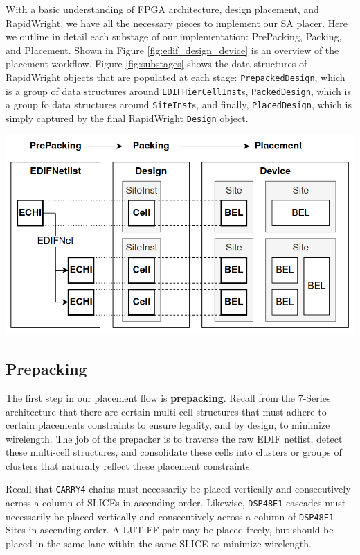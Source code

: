 \begin{multicols}{2}
\label{sec:simulated_annealing}
With a basic understanding of FPGA architecture, design placement, and RapidWright, we have all the necessary pieces to implement our SA placer. 
Here we outline in detail each substage of our implementation: PrePacking, Packing, and Placement. 
Shown in Figure \ref{fig:edif_design_device} is an overview of the placement workflow. 
Figure \ref{fig:substages} shows the data structures of RapidWright objects that are populated at each stage: \texttt{PrepackedDesign}, which is a group of data structures around \texttt{EDIFHierCellInst}s, \texttt{PackedDesign}, which is a group fo data structures around \texttt{SiteInst}s, and finally, \texttt{PlacedDesign}, which is simply captured by the final RapidWright \texttt{Design} object. 

\vspace{0.5cm}
{
    \centering
    \includegraphics[width=0.9\columnwidth]{figures/edif_design_device.png}
    \label{fig:edif_design_device}
}


\subsection{Prepacking}
\label{subsec:prepacking}


The first step in our placement flow is \textbf{prepacking}. 
Recall from the 7-Series architecture that there are certain multi-cell structures that must adhere to certain placements constraints to ensure legality, and by design, to minimize wirelength. 
The job of the prepacker is to traverse the raw EDIF netlist, detect these multi-cell structures, and consolidate these cells into clusters or groups of clusters that naturally reflect these placement constraints. 

Recall that \texttt{CARRY4} chains must necessarily be placed vertically and consecutively across a column of SLICEs in ascending order. 
Likewise, \texttt{DSP48E1} cascades must necessarily be placed vertically and consecutively across a column of \texttt{DSP48E1} Sites in ascending order. 
A LUT-FF pair may be placed freely, but should be placed in the same lane within the same SLICE to minimize wirelength.


\end{multicols}
